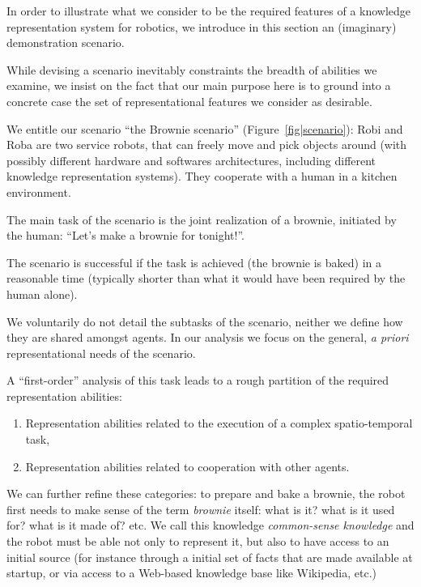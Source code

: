 \documentclass[a4paper, twocolumn]{article}
\begin{document}
In order to illustrate what we consider to be the required features of a
knowledge representation system for robotics, we introduce in this section an
(imaginary) demonstration scenario.

While devising a scenario inevitably constraints the breadth of abilities we
examine, we insist on the fact that our main purpose here is to ground into a
concrete case the set of representational features we consider as desirable.

We entitle our scenario ``the Brownie scenario'' (Figure~\ref{fig|scenario}):
Robi and Roba are two service robots, that can freely
move and pick objects around (with possibly different hardware and softwares
architectures, including different knowledge representation systems). They
cooperate with a human in a kitchen environment.

The main task of the scenario is the joint realization of a brownie, initiated
by the human: ``Let's make a brownie for tonight!''.

The scenario is successful if the task is achieved (the brownie is baked) in a
reasonable time (typically shorter than what it would have been required by the
human alone).

We voluntarily do not detail the subtasks of the scenario, neither we define
how they are shared amongst agents. In our analysis we focus on the general,
\textit{a priori} representational needs of the scenario.

A ``first-order'' analysis of this task leads to a rough partition of the
required representation abilities:

\begin{enumerate}

	\item Representation abilities related to the execution of a complex
	spatio-temporal task,

	\item Representation abilities related to cooperation with other agents.

\end{enumerate}

We can further refine these categories: to prepare and bake a brownie, the
robot first needs to make sense of the term \emph{brownie} itself: what is it?
what is it used for? what is it made of? etc. We call this knowledge
\emph{common-sense knowledge} and the robot must be able not only to represent
it, but also to have access to an initial source (for instance through a initial
set of facts that are made available at startup, or via access to a Web-based
knowledge base like Wikipedia, etc.)
\end{document}
